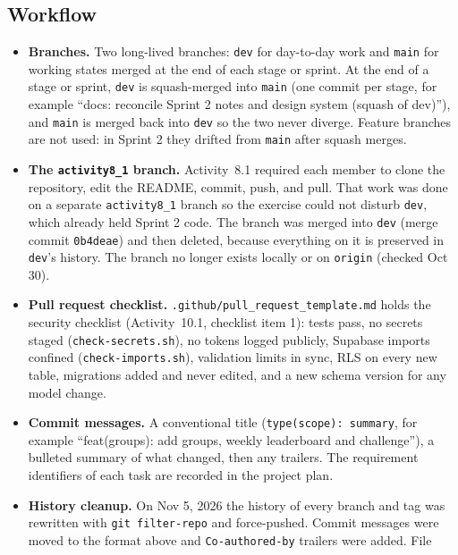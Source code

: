 \documentclass[12pt,letterpaper]{article}
\begin{document}
\subsection{Workflow}
\begin{itemize}
  \item \textbf{Branches.} Two long-lived branches: \texttt{dev} for day-to-day work
        and \texttt{main} for working states merged at the end of each stage or sprint. At the end of a stage or sprint,
        \texttt{dev} is squash-merged into \texttt{main} (one commit per stage, for
        example ``docs: reconcile Sprint 2 notes and design system (squash of dev)''), and \texttt{main} is merged
        back into \texttt{dev} so the two never diverge. Feature branches are not used:
        in Sprint 2 they drifted from \texttt{main} after squash merges.
  \item \textbf{The \texttt{activity8\_1} branch.} Activity~8.1 required each member to
        clone the repository, edit the README, commit, push, and pull. That work was
        done on a separate \texttt{activity8\_1} branch so the exercise could not
        disturb \texttt{dev}, which already held Sprint 2 code. The branch was merged
        into \texttt{dev} (merge commit \texttt{0b4deae}) and then deleted, because
        everything on it is preserved in \texttt{dev}'s history. The branch no longer
        exists locally or on \texttt{origin} (checked Oct 30).
  \item \textbf{Pull request checklist.} \texttt{.github/pull\_request\_template.md}
        holds the security checklist (Activity~10.1, checklist item 1): tests pass, no
        secrets staged (\texttt{check-secrets.sh}), no tokens logged publicly, Supabase
        imports confined (\texttt{check-imports.sh}), validation limits in sync, RLS on
        every new table, migrations added and never edited, and a new schema version
        for any model change.
  \item \textbf{Commit messages.} A conventional title (\texttt{type(scope): summary},
        for example ``feat(groups): add groups, weekly leaderboard and challenge''), a
        bulleted summary of what changed, then any trailers. The requirement identifiers
        of each task are recorded in the project plan.
  \item \textbf{History cleanup.} On Nov 5, 2026 the history of every branch and tag was
        rewritten with \texttt{git filter-repo} and force-pushed. Commit messages were
        moved to the format above and \texttt{Co-authored-by} trailers were added. File

\end{itemize}
\end{document}

